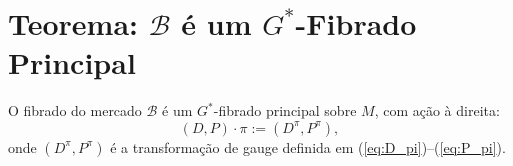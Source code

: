 \section{Teorema: $\mathcal{B}$ \'e um $G^*$-Fibrado Principal}

\begin{teo}\label{teo:fibrado_principal}
O fibrado do mercado $\mathcal{B}$ \'e um $G^*$-fibrado principal sobre $M$,
com a\c{c}\~ao \`a direita:
\begin{equation}\label{eq:acao_B}
 (D, P) \cdot \pi := (D^\pi, P^\pi),
\end{equation}
onde $(D^\pi, P^\pi)$ \'e a transforma\c{c}\~ao de gauge definida em
(\ref{eq:D_pi})--(\ref{eq:P_pi}).
\end{teo}

